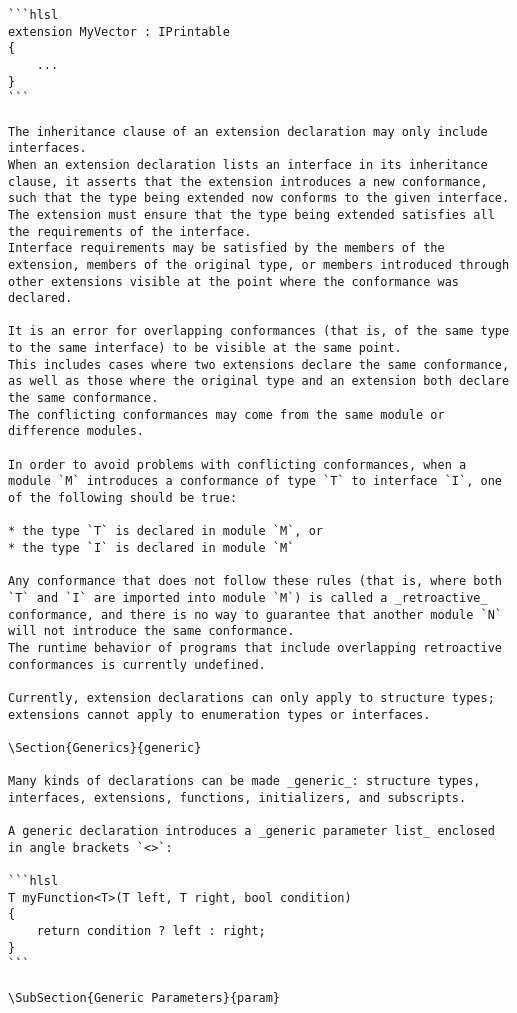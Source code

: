 \begin{verbatim}
```hlsl
extension MyVector : IPrintable
{
    ...
}
```

The inheritance clause of an extension declaration may only include interfaces.
When an extension declaration lists an interface in its inheritance clause, it asserts that the extension introduces a new conformance, such that the type being extended now conforms to the given interface.
The extension must ensure that the type being extended satisfies all the requirements of the interface.
Interface requirements may be satisfied by the members of the extension, members of the original type, or members introduced through other extensions visible at the point where the conformance was declared.

It is an error for overlapping conformances (that is, of the same type to the same interface) to be visible at the same point.
This includes cases where two extensions declare the same conformance, as well as those where the original type and an extension both declare the same conformance.
The conflicting conformances may come from the same module or difference modules.

In order to avoid problems with conflicting conformances, when a module `M` introduces a conformance of type `T` to interface `I`, one of the following should be true:

* the type `T` is declared in module `M`, or
* the type `I` is declared in module `M`

Any conformance that does not follow these rules (that is, where both `T` and `I` are imported into module `M`) is called a _retroactive_ conformance, and there is no way to guarantee that another module `N` will not introduce the same conformance.
The runtime behavior of programs that include overlapping retroactive conformances is currently undefined.

Currently, extension declarations can only apply to structure types; extensions cannot apply to enumeration types or interfaces.

\Section{Generics}{generic}

Many kinds of declarations can be made _generic_: structure types, interfaces, extensions, functions, initializers, and subscripts.

A generic declaration introduces a _generic parameter list_ enclosed in angle brackets `<>`:

```hlsl
T myFunction<T>(T left, T right, bool condition)
{
    return condition ? left : right;
}
```

\SubSection{Generic Parameters}{param}


\end{verbatim}
